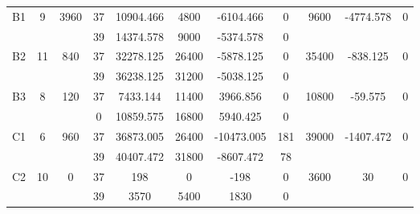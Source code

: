 \begin{sidewaystable}
\begin{tabular}{c||c|c||c|c|c|c|c||c|c|c}
         &
        
      \\
      \hline
      \multirow{2}{*}{B1} &
      \multirow{2}{*}{9} &
      \multirow{2}{*}{3960} &
      37 &
      10904.466 &
      4800 &
        -6104.466 &
        0 &
      \multirow{2}{*}{9600} &
        \multirow{2}{*}{-4774.578} &
        \multirow{2}{*}{0}
      \\
      \cline{4-8}
       &
       &
       &
      39 &
      14374.578 &
      9000 &
        -5374.578 &
        0 &
      
         &
        
      \\
      \hline
      \multirow{2}{*}{B2} &
      \multirow{2}{*}{11} &
      \multirow{2}{*}{840} &
      37 &
      32278.125 &
      26400 &
        -5878.125 &
        0 &
      \multirow{2}{*}{35400} &
        \multirow{2}{*}{-838.125} &
        \multirow{2}{*}{0}
      \\
      \cline{4-8}
       &
       &
       &
      39 &
      36238.125 &
      31200 &
        -5038.125 &
        0 &
      
         &
        
      \\
      \hline
      \multirow{2}{*}{B3} &
      \multirow{2}{*}{8} &
      \multirow{2}{*}{120} &
      37 &
      7433.144 &
      11400 &
        3966.856 &
        0 &
      \multirow{2}{*}{10800} &
        \multirow{2}{*}{-59.575} &
        \multirow{2}{*}{0}
      \\
      \cline{4-8}
       &
       &
       &
      0 &
      10859.575 &
      16800 &
        5940.425 &
        0 &
      
         &
        
      \\
      \hline
      \multirow{2}{*}{C1} &
      \multirow{2}{*}{6} &
      \multirow{2}{*}{960} &
      37 &
      36873.005 &
      26400 &
        -10473.005 &
        181 &
      \multirow{2}{*}{39000} &
        \multirow{2}{*}{-1407.472} &
        \multirow{2}{*}{0}
      \\
      \cline{4-8}
       &
       &
       &
      39 &
      40407.472 &
      31800 &
        -8607.472 &
        78 &
      
         &
        
      \\
      \hline
      \multirow{2}{*}{C2} &
      \multirow{2}{*}{10} &
      \multirow{2}{*}{0} &
      37 &
      198 &
      0 &
        -198 &
        0 &
      \multirow{2}{*}{3600} &
        \multirow{2}{*}{30} &
        \multirow{2}{*}{0}
      \\
      \cline{4-8}
       &
       &
       &
      39 &
      3570 &
      5400 &
        1830 &
        0 &
      

\end{tabular}
\end{sidewaystable}
